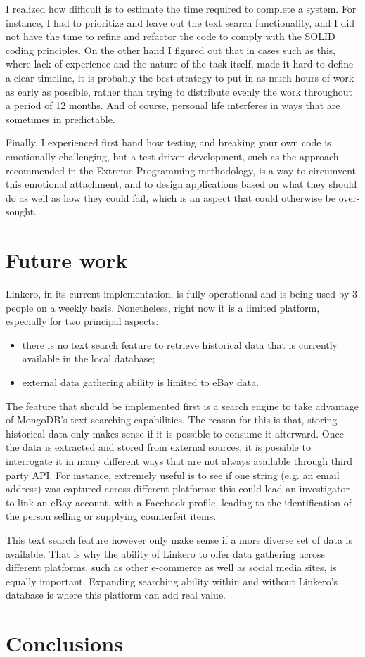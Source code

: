 I realized how difficult is to estimate the time required to complete a system.
For instance, I had to prioritize and leave out the text search functionality,
and I did not have the time to refine and refactor the code to comply with the
SOLID coding principles. On the other hand I figured out that in cases such as
this, where lack of experience and the nature of the task itself, made it hard
to define a clear timeline, it is probably the best strategy to put in as much
hours of work as early as possible, rather than trying to distribute evenly the
work throughout a period of 12 months. And of course, personal life interferes
in ways that are sometimes in predictable.

Finally, I experienced first hand how testing and breaking your own code is
emotionally challenging, but a test-driven development, such as the approach
recommended in the Extreme Programming methodology, is a way to circumvent this
emotional attachment, and to design applications based on what they should do as
well as how they could fail, which is an aspect that could otherwise be
over-sought.


\section{Future work}
Linkero, in its current implementation, is fully operational and is being used
by 3 people on a weekly basis. Nonetheless, right now it is a limited platform,
especially for two principal aspects:
\begin{itemize}
  \item there is no text search feature to retrieve historical data that is
  currently available in the local database;
  \item external data gathering ability is limited to eBay data.
\end{itemize}

The feature that should be implemented first is a search engine to take
advantage of MongoDB's text searching capabilities. The reason for this is that,
storing historical data only makes sense if it is possible to consume it
afterward. Once the data is extracted and stored from external sources, it is
possible to interrogate it in many different ways that are not always available
through third party API. For instance, extremely useful is to see if one string
(e.g. an email address) was captured across different platforms: this could lead
an investigator to link an eBay account, with a Facebook profile, leading to the
identification of the person selling or supplying counterfeit items.

This text search feature however only make sense if a more diverse set of
data is available. That is why the ability of Linkero to offer data gathering
across different platforms, such as other e-commerce as well as social media
sites, is equally important. Expanding searching ability within and without
Linkero's database is where this platform can add real value.

\section{Conclusions}

